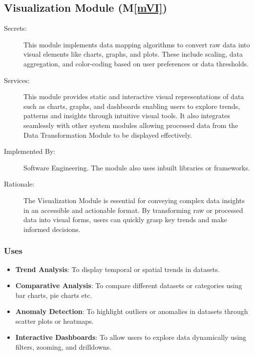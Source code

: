\documentclass[12pt, titlepage]{article}
\newcommand{\mref}[1]{M\ref{#1}}
\begin{document}
\subsection{Visualization Module (\mref{mVI})}
\begin{description}
  \item[Secrets:] This module implements data mapping algorithms to convert raw data into visual 
  elements like charts, graphs, and plots. These include scaling, data aggregation, and color-coding 
  based on user preferences or data thresholds.
  \item[Services:] This module provides static and interactive visual representations of data such as 
  charts, graphs, and dashboards enabling users to explore trends, patterns and insights through intuitive 
  visual tools. It also integrates seamlessly with other system modules allowing processed data from 
  the Data Transformation Module to be displayed effectively.
  \item[Implemented By:] Software Engineering. The module also uses inbuilt libraries or frameworks.
  \item[Rationale:] The Visualization Module is essential for conveying complex data insights in an 
  accessible and actionable format. By transforming raw or processed data into visual forms, users can 
  quickly grasp key trends and make informed decisions.
\end{description}

\subsubsection{Uses}
\begin{itemize}
  \item \textbf{Trend Analysis}: To display temporal or spatial trends in datasets.
  \item \textbf{Comparative Analysis}: To compare different datasets or categories using 
  bar charts, pie charts etc.
  \item \textbf{Anomaly Detection}: To highlight outliers or anomalies in datasets through scatter 
  plots or heatmaps.
  \item \textbf{Interactive Dashboards}: To allow users to explore data dynamically using filters, 
  zooming, and drilldowns.
\end{itemize}
\end{document}
